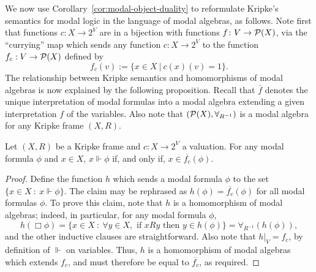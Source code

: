 We now use Corollary~\ref{cor:modal-object-duality} to reformulate Kripke's semantics for modal logic in the language of modal algebras, as follows. Note first that functions $c \colon X \to 2^V$ are in a bijection with functions $f \colon V \to \mathcal{P}(X)$, via the ``currying'' map which sends any function $c \colon X \to 2^V$ to the function $f_c : V \to \mathcal{P}(X)$ defined by
\[ f_c(v) := \{ x \in X \ | \ c(x)(v) = 1\}.\]
The relationship between Kripke semantics and homomorphisms of modal algebras is now explained by the following proposition. Recall that $\bar{f}$ denotes the unique interpretation of modal formulas into a modal algebra extending a given interpretation $f$ of the variables. Also note that $(\mathcal{P}(X), \forall_{R^{-1}})$ is a modal algebra for any Kripke frame $(X,R)$.
\begin{proposition}\label{prop:kripke-semantics}
	Let $(X,R)$ be a Kripke frame and $c \colon X \to 2^V$ a valuation. For any modal formula $\phi$ and $x \in X$, $x \Vdash \phi$ if, and only if, $x \in \overline{f_c}(\phi)$.
\end{proposition}
\begin{proof}
Define the function $h$ which sends a modal formula $\phi$ to the set $\{ x \in X \ \colon \ x \Vdash \phi\}$. The claim may be rephrased as $h(\phi) = \overline{f_c}(\phi)$ for all modal formulas $\phi$. To prove this claim, note that $h$ is a homomorphism of modal algebras; indeed, in particular, for any modal formula $\phi$,
\[ h(\Box \phi) = \{ x \in X \ \colon \ \forall y \in X, \text{ if } x R y \text{ then } y \in h(\phi)\} = \forall_{R^{-1}} (h(\phi)),\]
and the other inductive clauses are straightforward. Also note that $h|_V = f_c$, by definition of $\Vdash$ on variables. Thus, $h$ is a homomorphism of modal algebras which extends $f_c$, and must therefore be equal to $\overline{f_c}$, as required.
\end{proof}

